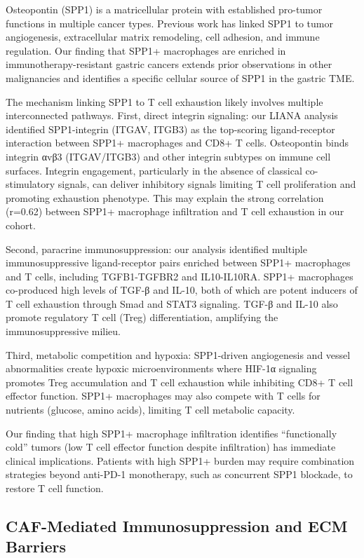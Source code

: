 \documentclass[12pt,twoside]{article}
\begin{document}
Osteopontin (SPP1) is a matricellular protein with established pro-tumor functions in multiple cancer types. Previous work has linked SPP1 to tumor angiogenesis, extracellular matrix remodeling, cell adhesion, and immune regulation. Our finding that SPP1+ macrophages are enriched in immunotherapy-resistant gastric cancers extends prior observations in other malignancies and identifies a specific cellular source of SPP1 in the gastric TME.

The mechanism linking SPP1 to T cell exhaustion likely involves multiple interconnected pathways. First, direct integrin signaling: our LIANA analysis identified SPP1-integrin (ITGAV, ITGB3) as the top-scoring ligand-receptor interaction between SPP1+ macrophages and CD8+ T cells. Osteopontin binds integrin αvβ3 (ITGAV/ITGB3) and other integrin subtypes on immune cell surfaces. Integrin engagement, particularly in the absence of classical co-stimulatory signals, can deliver inhibitory signals limiting T cell proliferation and promoting exhaustion phenotype. This may explain the strong correlation (r=0.62) between SPP1+ macrophage infiltration and T cell exhaustion in our cohort.

Second, paracrine immunosuppression: our analysis identified multiple immunosuppressive ligand-receptor pairs enriched between SPP1+ macrophages and T cells, including TGFB1-TGFBR2 and IL10-IL10RA. SPP1+ macrophages co-produced high levels of TGF-β and IL-10, both of which are potent inducers of T cell exhaustion through Smad and STAT3 signaling. TGF-β and IL-10 also promote regulatory T cell (Treg) differentiation, amplifying the immunosuppressive milieu.

Third, metabolic competition and hypoxia: SPP1-driven angiogenesis and vessel abnormalities create hypoxic microenvironments where HIF-1α signaling promotes Treg accumulation and T cell exhaustion while inhibiting CD8+ T cell effector function. SPP1+ macrophages may also compete with T cells for nutrients (glucose, amino acids), limiting T cell metabolic capacity.

Our finding that high SPP1+ macrophage infiltration identifies ``functionally cold'' tumors (low T cell effector function despite infiltration) has immediate clinical implications. Patients with high SPP1+ burden may require combination strategies beyond anti-PD-1 monotherapy, such as concurrent SPP1 blockade, to restore T cell function.

\subsection{CAF-Mediated Immunosuppression and ECM Barriers}
\end{document}

